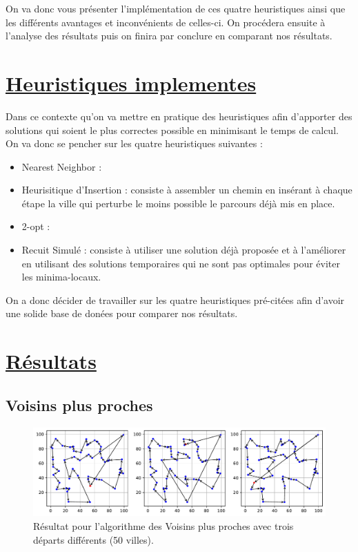 \documentclass[a4paper,11pt,fleqn]{article}
\begin{document}
On va donc vous présenter l’implémentation de ces quatre heuristiques ainsi que les différents avantages et inconvénients de celles-ci. 
On procédera ensuite à l’analyse des résultats puis on finira par conclure en comparant nos résultats. 
\newpage

\section*{\underline{Heuristiques implementes}}
Dans ce contexte qu’on va mettre en pratique des heuristiques afin d’apporter des solutions qui soient le plus correctes possible en minimisant le temps de calcul.
On va donc se pencher sur les quatre heuristiques suivantes :
\begin{itemize}
    \item Nearest Neighbor : 
    \item Heurisitique d’Insertion : consiste à assembler un chemin en insérant à chaque étape la ville qui perturbe le moins possible le parcours déjà mis en place. 
    \item 2-opt :
    \item Recuit Simulé : consiste à utiliser une solution déjà proposée et à l’améliorer en utilisant des solutions temporaires qui ne sont pas optimales pour éviter les minima-locaux. 
\end{itemize}
On a donc décider de travailler sur les quatre heuristiques pré-citées afin d'avoir une solide base de donées pour comparer nos résultats.

\newpage

\section*{\underline{Résultats}}

\subsection*{Voisins plus proches}

\begin{figure}[H]
    \centering
    \includegraphics[width=\textwidth]{images/NN_50_villes_3departs.pdf}
    \caption{Résultat pour l'algorithme des Voisins plus proches avec trois départs différents (50 villes).}
    \label{fig:nn-50}
\end{figure}
\end{document}
